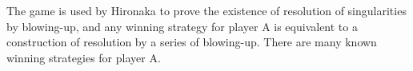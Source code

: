 \documentclass[12pt]{article}
\theoremstyle{definition}
\theoremstyle{plain}
\begin{document}
The game is used by Hironaka to prove the existence of resolution of singularities
by blowing-up, and any winning strategy for player A is equivalent to 
a construction of resolution by a series of blowing-up. 
There are many known winning strategies for player A. \cite{}

% 
% 
% 
\end{document}
